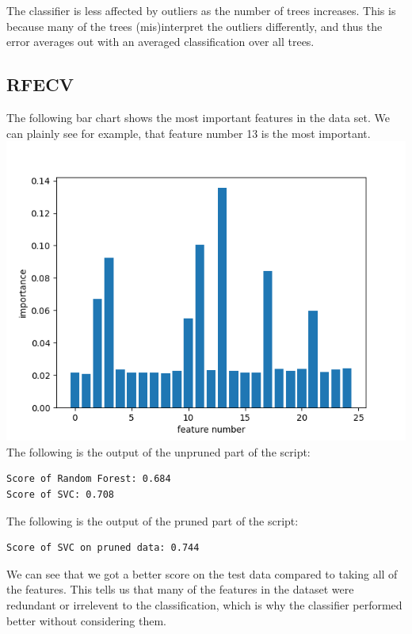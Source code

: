     The classifier is less affected by outliers as the number of trees increases.
    This is because many of the trees (mis)interpret the outliers differently, and thus the error averages out with an
    averaged classification over all trees.


    \subsection{RFECV}
    The following bar chart shows the most important features in the data set.
    We can plainly see for example, that feature number 13 is the most important.
    \includegraphics[width=\textwidth]{plots/randomtree_feat_importances}
    The following is the output of the unpruned part of the script:
    \begin{verbatim}
Score of Random Forest: 0.684
Score of SVC: 0.708
    \end{verbatim}

    The following is the output of the pruned part of the script:
    \begin{verbatim}
Score of SVC on pruned data: 0.744
    \end{verbatim}
    We can see that we got a better score on the test data compared to taking all of the features.
    This tells us that many of the features in the dataset were redundant or irrelevent to the classification,
    which is why the classifier performed better without considering them.


